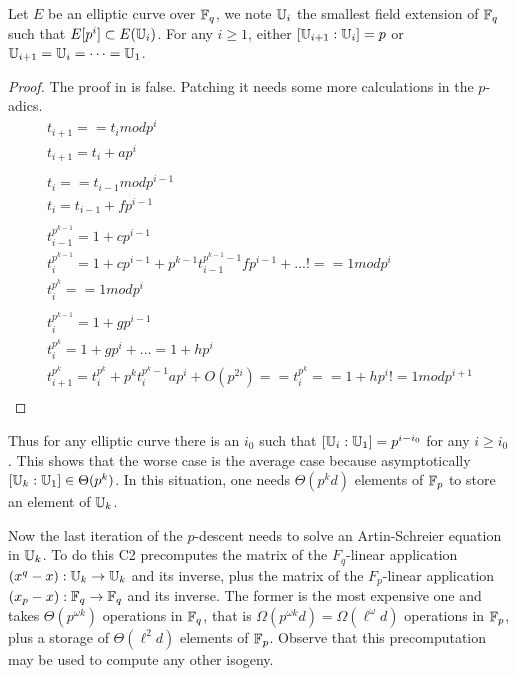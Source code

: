 \begin{proposition}
  \label{th:tower}
  Let $E$ be an elliptic curve over $\mathbb{F}_q$, we note $\mathbb{U}_i$ the
  smallest field extension of $\mathbb{F}_q$ such that $E[p^i]\subset
  E(\mathbb{U}_i)$. For any $i\ge1$, either $[\mathbb{U}_{i+1}:\mathbb{U}_i] = p$ or
  $\mathbb{U}_{i+1}=\mathbb{U}_i=\cdots=\mathbb{U}_1$.
\end{proposition}
\begin{proof}
  The proof in \cite{Ler97} is false. Patching it needs some more
  calculations in the $p$-adics.
  \begin{gather}
    t_{i+1} == t_i mod p^i\\
    t_{i+1} = t_i + ap^i\\
    \\
    t_i == t_{i-1} mod p^{i-1}\\
    t_i = t_{i-1} + fp^{i-1}\\
    \\
    t_{i-1}^{p^{k-1}} = 1 + cp^{i-1}\\
    t_i^{p^{k-1}} = 1 + cp^{i-1} + p^{k-1}t_{i-1}^{p^{k-1}-1}fp^{i-1} + ... !== 1 mod p^i\\
    t_i^{p^k} == 1 mod p^i\\
    \\
    t_i^{p^{k-1}} = 1 + gp^{i-1} \\
    t_i^{p^k} = 1 + gp^{i} + ... = 1 + hp^{i}\\
    t_{i+1}^{p^k} = t_i^{p^k} + p^kt_i^{p^k-1}ap^i + O(p^{2i}) == t_i^{p^k} == 1 + hp^i != 1 mod p^{i+1}\\
  \end{gather}
\end{proof}

Thus for any elliptic curve there is an $i_0$ such that $[\mathbb{U}_i:\mathbb{U}_1] =
p^{i-i_0}$ for any $i \ge i_0$. This shows that the worse case is the
average case because asymptotically $[\mathbb{U}_k:\mathbb{U}_1] \in \Theta(p^k)$. In
this situation, one needs $\Theta(p^kd)$ elements of $\mathbb{F}_p$ to store
an element of $\mathbb{U}_k$.

Now the last iteration of the $p$-descent needs to solve an
Artin-Schreier equation in $\mathbb{U}_k$. To do this C2 precomputes the
matrix of the $F_q$-linear application $(x^q-x):\mathbb{U}_k\rightarrow\mathbb{U}_k$
and its inverse, plus the matrix of the $F_p$-linear application
$(x_p-x):\mathbb{F}_q\rightarrow\mathbb{F}_q$ and its inverse. The former is the most
expensive one and takes $\Theta(p^{\omega k})$ operations in $\mathbb{F}_q$,
that is $\Omega(p^{\omega k}d) = \Omega(\ell^\omega d)$ operations in
$\mathbb{F}_p$, plus a storage of $\Theta(\ell^2d)$ elements of
$\mathbb{F}_p$. Observe that this precomputation may be used to compute any
other isogeny.

